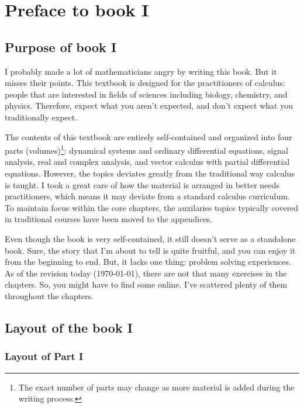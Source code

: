 \chapter*{Preface to book I}

\section*{Purpose of book I}

I probably made a lot of mathematicians angry by writing this book. But it misses their points. This textbook is designed for the practitioners of calculus: people that are interested in fields of sciences including biology, chemistry, and physics. Therefore, expect what you aren't expected, and don't expect what you traditionally expect.

The contents of this textbook are entirely self-contained and organized into four parts (volumes)\footnote{The exact number of parts may change as more material is added during the writing process.}: dynamical systems and ordinary differential equations, signal analysis, real and complex analysis, and vector calculus with partial differential equations. However, the topics deviates greatly from the traditional way calculus is taught. I took a great care of how the material is arranged in better needs practitioners, which means it may deviate from a standard calculus curriculum. To maintain focus within the core chapters, the auxilaries topics typically covered in traditional courses have been moved to the appendices.

Even though the book is very self-contained, it still doesn't serve as a standalone book. Sure, the story that I'm about to tell is quite fruitful, and you can enjoy it from the beginning to end. But, it lacks one thing: problem solving experiences. As of the revision today (\today), there are not that many exercises in the chapters. So, you might have to find some online. I've scattered plenty of them throughout the chapters.

\section*{Layout of the book I}

\subsection*{Layout of Part I}

